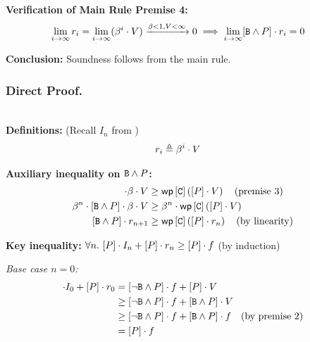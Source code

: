 \noindent\textbf{Verification of Main Rule Premise 4:}
\begin{align*}
  \lim_{i \to \infty} r_i = \lim_{i \to \infty} (\beta^i \cdot V) \xrightarrow{\beta < 1, V < \infty} 0
    &\implies \lim_{i \to \infty} [\mathtt{B} \wedge P] \cdot r_i = 0
\end{align*}

\noindent\textbf{Conclusion:} Soundness follows from the main rule. \quad \checkmark
\\
\subsubsection{Direct Proof.}~\\
\noindent\textbf{Definitions:} (Recall $I_n$ from )
\begin{align*}
  r_i &\triangleq \beta^i \cdot V
\end{align*}

\noindent\textbf{Auxiliary inequality on $\mathtt{B} \wedge P$:}
\begin{align*}
  [\bexpr \wedge \pred] \cdot \beta \cdot V &\geq \WP{\cmd}{[\pred] \cdot V} \quad \text{(premise 3)} \\
  \beta^n \cdot [\bexpr \wedge \pred] \cdot \beta \cdot V &\geq \beta^n \cdot \WP{\cmd}{[\pred] \cdot V} \\
  [\bexpr \wedge \pred] \cdot r_{n+1} &\geq \WP{\cmd}{[\pred] \cdot r_n} \quad \text{(by linearity)}
\end{align*}

\noindent\textbf{Key inequality:} $\forall n.\ [P] \cdot I_n + [P] \cdot r_n \geq [P] \cdot f$ (by induction)

\noindent\textit{Base case $n = 0$:}
\begin{align*}
  [\pred] \cdot I_0 + [\pred] \cdot r_0
    &= [\neg\bexpr \wedge \pred] \cdot \ex + [\pred] \cdot V \\
    &\geq [\neg\bexpr \wedge \pred] \cdot \ex + [\bexpr \wedge \pred] \cdot V \\
    &\geq [\neg\bexpr \wedge \pred] \cdot \ex + [\bexpr \wedge \pred] \cdot \ex \quad \text{(by premise 2)} \\
    &= [\pred] \cdot \ex
\end{align*}

